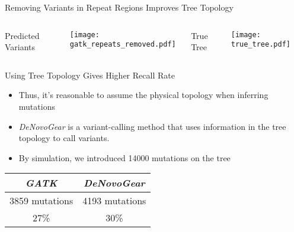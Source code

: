 \documentclass{beamer}
\begin{document}
\begin{frame}{Removing Variants in Repeat Regions Improves Tree Topology}
	\begin{columns}
		\begin{center}
		Predicted Variants
		\end{center}
		\texttt{[image: gatk\_repeats\_removed.pdf]}
		\begin{center}
		True Tree
		\end{center}
		\texttt{[image: true\_tree.pdf]}
	\end{columns}
\end{frame}

\begin{frame}{Using Tree Topology Gives Higher Recall Rate}
	\begin{itemize}
	\item Thus, it's reasonable to assume the physical topology when inferring mutations
	\item \textit{DeNovoGear} is a variant-calling method that uses information in the tree topology to call variants.
	\item By simulation, we introduced 14000 mutations on the tree
	\end{itemize}
	\begin{center}
	\begin{tabular}{ c | c }
	\textit{GATK} & \textit{DeNovoGear} \\
	\hline
	3859 mutations & 4193 mutations \\
	27\% & 30\%
	\end{tabular}
	\end{center}
\end{frame}

\end{document}
